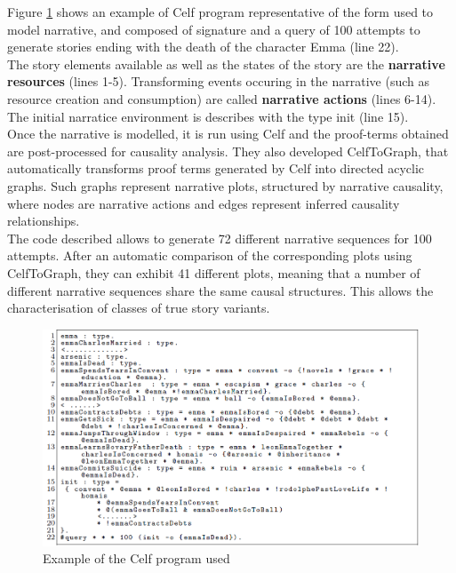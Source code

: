 \documentclass[11pt]{article}
\begin{document}
Figure \ref{Figure celf} shows an example of Celf program representative of the form used to model narrative, and composed of signature and a query of 100 attempts to generate stories ending with the death of the character Emma (line 22). \\

The story elements available as well as the states of the story are the \textbf{narrative resources} (lines 1-5). Transforming events occuring in the narrative (such as resource creation and consumption) are called \textbf{narrative actions} (lines 6-14). The initial narratice environment is describes with the type init (line 15).\\

Once the narrative is modelled, it is run using Celf and the proof-terms obtained are post-processed for causality analysis. They also developed CelfToGraph, that automatically transforms proof terms generated by Celf into directed acyclic graphs. Such graphs represent narrative plots, structured by narrative causality, where nodes are narrative actions and edges represent inferred causality relationships.\\

The code described allows to generate 72 different narrative sequences for 100 attempts. After an automatic comparison of the corresponding plots using CelfToGraph, they can exhibit 41 different plots, meaning that a number of different narrative sequences share the same causal structures. This allows the characterisation of classes of true story variants.
\begin{figure}[!h]
   	\centerline{\includegraphics[scale=0.6]{./images/celf}}
   	\caption{\label{Figure celf} Example of the Celf program used \cite{Martens13}}
\end{figure}
\end{document}
